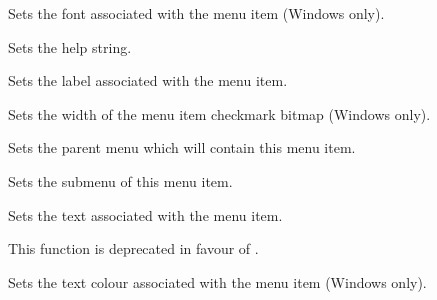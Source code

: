 \label{wxmenuitemsetfont}


Sets the font associated with the menu item (Windows only).


\label{wxmenuitemsethelp}


Sets the help string.


\label{wxmenuitemsetitemlabel}


Sets the label associated with the menu item.


\label{wxmenuitemsetmarginwidth}


Sets the width of the menu item checkmark bitmap (Windows only).


\label{wxmenuitemsetmenu}


Sets the parent menu which will contain this menu item.


\label{wxmenuitemsetsubmenu}


Sets the submenu of this menu item.


\label{wxmenuitemsettext}


Sets the text associated with the menu item.

This function is deprecated in favour of .


\label{wxmenuitemsettextcolour}


Sets the text colour associated with the menu item (Windows only).

